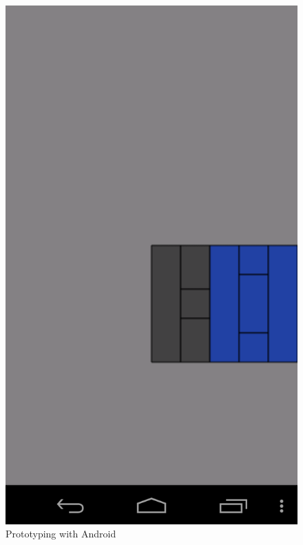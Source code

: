 \documentclass{article}
\begin{document}
\begin{figure}[p]
    \centering
    \includegraphics[width=1\textwidth]{prototype.png}
    \caption{Prototyping with Android}
    \label{fig:board}
\end{figure}
\end{document}
